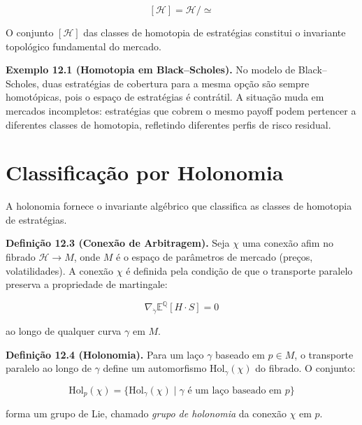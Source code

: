 \begin{equation}\label{eq:classes-homotopia}
[\mathcal{H}] = \mathcal{H} / \simeq
\end{equation}

O conjunto $[\mathcal{H}]$ das classes de homotopia de estrat\'egias constitui o invariante topol\'ogico fundamental do mercado.

\smallskip
\noindent\textbf{Exemplo 12.1 (Homotopia em Black--Scholes).} No modelo de Black--Scholes, duas estrat\'egias de cobertura para a mesma op\c{c}\~ao s\~ao sempre homot\'opicas, pois o espa\c{c}o de estrat\'egias \'e contr\'atil. A situa\c{c}\~ao muda em mercados incompletos: estrat\'egias que cobrem o mesmo payoff podem pertencer a diferentes classes de homotopia, refletindo diferentes perfis de risco residual.

\section{Classifica\c{c}\~ao por Holonomia}

A holonomia fornece o invariante alg\'ebrico que classifica as classes de homotopia de estrat\'egias.

\smallskip
\noindent\textbf{Defini\c{c}\~ao 12.3 (Conex\~ao de Arbitragem).} Seja $\chi$ uma conex\~ao afim no fibrado $\mathcal{H} \to M$, onde $M$ \'e o espa\c{c}o de par\^ametros de mercado (pre\c{c}os, volatilidades). A conex\~ao $\chi$ \'e definida pela condi\c{c}\~ao de que o transporte paralelo preserva a propriedade de martingale:

\begin{equation}\label{eq:conexao-martingale}
\nabla_{\dot{\gamma}} \mathbb{E}^{\mathbb{Q}}[H \cdot S] = 0
\end{equation}

ao longo de qualquer curva $\gamma$ em $M$.

\medskip
\noindent\textbf{Defini\c{c}\~ao 12.4 (Holonomia).} Para um la\c{c}o $\gamma$ baseado em $p \in M$, o transporte paralelo ao longo de $\gamma$ define um automorfismo $\text{Hol}_\gamma(\chi)$ do fibrado. O conjunto:

\begin{equation}\label{eq:grupo-holonomia}
\text{Hol}_p(\chi) = \{\text{Hol}_\gamma(\chi) \mid \gamma \text{ \'e um la\c{c}o baseado em } p\}
\end{equation}

forma um grupo de Lie, chamado \textit{grupo de holonomia} da conex\~ao $\chi$ em $p$.

